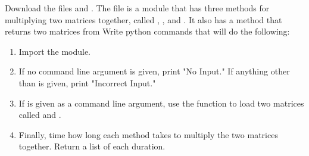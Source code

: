 \begin{problem}

Download the files  and .
The file  is a module that has three methods for multiplying two matrices together, called , , and .
It also has a  method that returns two matrices from 
Write python commands that will do the following:
\begin{enumerate}
\item Import the  module.
\item If no command line argument is given, print "No Input."  If anything other than  is given, print "Incorrect Input."
\item If  is given as a command line argument, use the  function to load two matrices called  and .
\item Finally, time how long each method takes to multiply the two matrices together.  Return a list of each duration.
\end{enumerate}
\end{problem}




